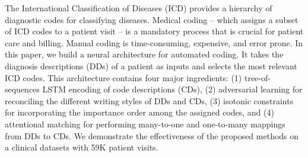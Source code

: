 The International Classification of Diseases (ICD) provides a hierarchy of diagnostic codes for classifying diseases. Medical coding -- which assigns a subset of ICD codes to a patient visit -- is a mandatory process that is crucial for patient care and billing. Manual coding is time-consuming, expensive, and error prone. In this paper, we build a neural architecture for automated coding. It takes the diagnosis descriptions (DDs) of a patient as inputs and selects the most relevant ICD codes. This architecture contains four major ingredients: (1) tree-of-sequences LSTM encoding of code descriptions (CDs), (2) adversarial learning for reconciling the different writing styles of DDs and CDs, (3) isotonic constraints for incorporating the importance order among the assigned codes, and (4) attentional matching for performing many-to-one and one-to-many mappings from DDs to CDs. We demonstrate the effectiveness of the proposed methods on a clinical datasets with 59K patient visits.
